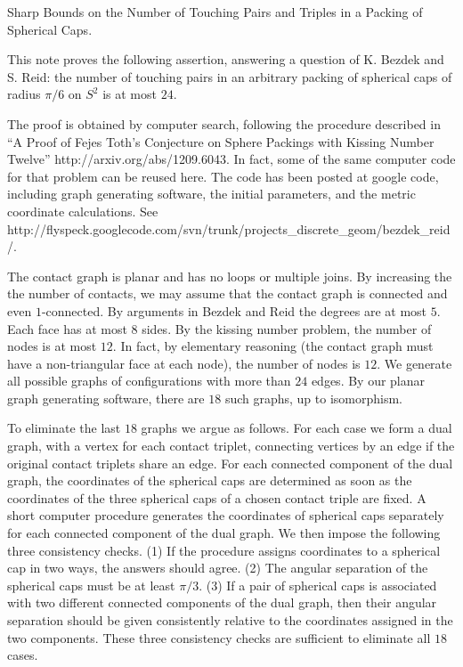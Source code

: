 Sharp Bounds on the Number of Touching Pairs and Triples in a
Packing of Spherical Caps.



This note proves the following assertion, answering a question of
K. Bezdek and S. Reid: the number of touching pairs in an arbitrary
packing of spherical caps of radius $\pi/6$ on $S^2$ is at most $24$.

The proof is obtained by computer search, following the procedure
described in ``A Proof of Fejes Toth's Conjecture on Sphere Packings
with Kissing Number Twelve'' http://arxiv.org/abs/1209.6043.  In fact,
some of the same computer code for that problem can be reused here.
The code has been posted at google code, including graph
generating software, the initial parameters, and the metric coordinate
calculations.  See
http://flyspeck.googlecode.com/svn/trunk/projects_discrete_geom/bezdek_reid/.

The contact graph is planar and has no loops or multiple joins.  By
increasing the the number of contacts, we may assume that the contact
graph is connected and even $1$-connected.  By arguments in Bezdek and
Reid the degrees are at most $5$.  Each face has at most $8$ sides.
By the kissing number problem, the number of nodes is at most $12$.
In fact, by elementary reasoning (the contact graph must have a
non-triangular face at each node), the number of nodes is $12$.  We
generate all possible graphs of configurations with more than $24$
edges.  By our planar graph generating software, there are $18$ such
graphs, up to isomorphism.

To eliminate the last $18$ graphs we argue as follows. For each case
we form a dual graph, with a vertex for each contact triplet,
connecting vertices by an edge if the original contact triplets share
an edge.  For each connected component of the dual graph, the
coordinates of the spherical caps are determined as soon as the
coordinates of the three spherical caps of a chosen contact triple are
fixed.  A short computer procedure generates the coordinates of
spherical caps separately for each connected component of the dual
graph.  We then impose the following three consistency checks. (1) If
the procedure assigns coordinates to a spherical cap in two ways, the
answers should agree. (2) The angular separation of the spherical caps
must be at least $\pi/3$.  (3) If a pair of spherical caps is
associated with two different connected components of the dual graph,
then their angular separation should be given consistently relative to
the coordinates assigned in the two components.  These three
consistency checks are sufficient to eliminate all $18$ cases.


